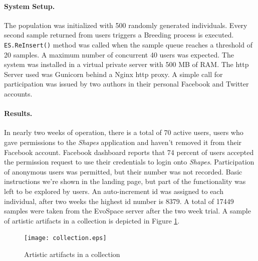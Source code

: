 \documentclass{llncs}
\begin{document}
\paragraph{System Setup.}
The population was initialized with 500 randomly generated individuals. Every second sample returned from users triggers a Breeding process is executed.
\texttt{ES.ReInsert()} method was called when the sample queue reaches a threshold of 20 samples.
A maximum number of concurrent 40 users was expected.
The system was installed in a virtual private server with 500 MB of RAM.
The http Server used was Gunicorn behind a Nginx http proxy.
A simple call for participation was issued by two authors in their personal Facebook and Twitter accounts.


\paragraph{Results.}
In nearly two weeks of operation, there is a total of 70 active users, users who gave permissions to the \emph{Shapes} application and haven't
removed it from their Facebook account.
Facebook dashboard reports that 74 percent of users accepted the permission request to use their credentials to login onto \emph{Shapes}.
Participation of anonymous users was permitted, but their number was not recorded.
Basic instructions we're shown in the landing page, but part of the functionality was left to be explored by users.
An auto-increment id was assigned to each individual, after two weeks the highest id number is 8379.
A total of 17449 samples were taken from the EvoSpace server after the two week trial. A sample of artistic artifacts in a collection is depicted in Figure \ref{fig:collection}.

\begin{figure}[t]
    \centering
        \texttt{[image: collection.eps]}
    \caption{Artistic artifacts in a collection }
    \label{fig:collection}
\end{figure}
\end{document}
